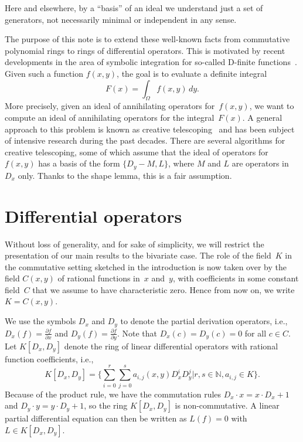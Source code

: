 \documentclass[a4paper,draft]{amsart}
\let\set\mathbb
\begin{document}
Here and elsewhere, by a ``basis'' of an ideal we understand just a set of generators, not
necessarily minimal or independent in any sense.

The purpose of this note is to extend these well-known facts from commutative polynomial
rings to rings of differential operators. This is motivated by recent developments in the
area of symbolic integration for so-called D-finite functions~\cite{kauers23c}. Given such a
function $f(x,y)$, the goal is to evaluate a definite integral
\[
  F(x) = \int_\Omega f(x,y)\,dy.
\]
More precisely, given an ideal of annihilating operators for~$f(x,y)$, we want to compute
an ideal of annihilating operators for the integral~$F(x)$. A general approach to this
problem is known as creative telescoping~\cite{zeilberger90,zeilberger91,koutschan13,chyzak14}
and has been subject of intensive research
during the past decades. There are several algorithms for creative telescoping, some of
which assume that the ideal of operators for $f(x,y)$ has a basis of the form $\{D_y-M,L\}$,
where $M$ and $L$ are operators in $D_x$ only. Thanks to the shape lemma, this is a fair
assumption.

\section{Differential operators}

Without loss of generality, and for sake of simplicity, we will
restrict the presentation of our main results to the bivariate
case. The role of the field~$K$ in the commutative setting sketched
in the introduction is now taken over by the field $C(x,y)$
of rational functions in~$x$ and~$y$, with coefficients in some
constant field~$C$ that we assume to have characteristic zero.
Hence from now on, we write $K=C(x,y)$.

We use the symbols $D_x$ and $D_y$ to denote the partial derivation
operators, i.e., $D_x(f)=\frac{\partial f}{\partial x}$ and
$D_y(f)=\frac{\partial f}{\partial y}$. Note that $D_x(c)=D_y(c)=0$
for all $c\in C$. Let $K[D_x,D_y]$ denote the ring of linear
differential operators with rational function coefficients, i.e.,
\[
  K[D_x,D_y] = \biggl\{ \sum_{i=0}^r\sum_{j=0}^s a_{i,j}(x,y) D_x^i D_y^j
  \mathrel{\bigg|} r,s\in\set N, a_{i,j} \in K \biggr\}.
\]
Because of the product rule, we have the commutation rules
$D_x\cdot x=x\cdot D_x+1$ and $D_y\cdot y=y\cdot D_y+1$, so the
ring $K[D_x,D_y]$ is non-commutative. A linear partial differential
equation can then be written as $L(f)=0$ with $L\in K[D_x,D_y]$.
\end{document}
